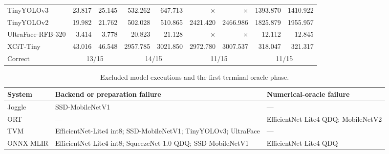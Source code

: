 \begin{table}[!htbp]
\begin{tabular*}{\textwidth}{@{\extracolsep{\fill}}lrrrrrrrr@{}}
    TinyYOLOv3 & 23.817 & 25.145 & 532.262 & 647.713 & $\times$ & $\times$ & 1393.870 & 1410.922 \\
    TinyYOLOv2 & 19.982 & 21.762 & 502.028 & 510.865 & 2421.420 & 2466.986 & 1825.879 & 1955.957 \\
    UltraFace-RFB-320 & 3.414 & 3.778 & 20.823 & 21.128 & $\times$ & $\times$ & 12.112 & 12.845 \\
    XCiT-Tiny & 43.016 & 46.548 & 2957.785 & 3021.850 & 2972.780 & 3007.537 & 318.047 & 321.317 \\
    \midrule
    Correct & \multicolumn{2}{c}{13/15} & \multicolumn{2}{c}{14/15}
    & \multicolumn{2}{c}{11/15} & \multicolumn{2}{c}{11/15} \\
    \bottomrule
  \end{tabular*}
\end{table}

\begin{table}[!htbp]
  \caption{Excluded model executions and the first terminal oracle phase.}
  \label{tab:model-failures}
  \centering
  \scriptsize
  \setlength{\tabcolsep}{4pt}
  \begin{tabular*}{\textwidth}{@{\extracolsep{\fill}}lll@{}}
    \toprule
    System & Backend or preparation failure & Numerical-oracle failure \\
    \midrule
    Joggle & SSD-MobileNetV1 & --- \\
    ORT & --- & EfficientNet-Lite4 QDQ; MobileNetV2 \\
    TVM & EfficientNet-Lite4 int8; SSD-MobileNetV1; TinyYOLOv3; UltraFace & --- \\
    ONNX-MLIR & EfficientNet-Lite4 int8; SqueezeNet-1.0 QDQ; SSD-MobileNetV1 & EfficientNet-Lite4 QDQ \\
    \bottomrule
  \end{tabular*}
\end{table}

